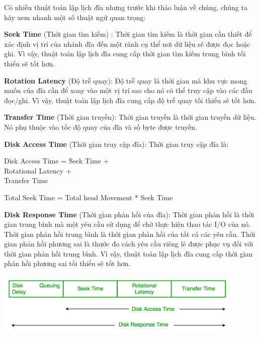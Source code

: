 \documentclass{report}
\begin{document}
    Có nhiều thuật toán lập lịch đĩa nhưng trước khi thảo luận về chúng, chúng ta hãy xem nhanh một số thuật ngữ quan trọng:

    \textbf{Seek Time} (Thời gian tìm kiếm) : Thời gian tìm kiếm là thời gian cần thiết để xác định vị trí của nhánh đĩa đến một rãnh cụ thể nơi dữ liệu sẽ được đọc hoặc ghi. Vì vậy, thuật toán lập lịch đĩa cung cấp thời gian tìm kiếm trung bình tối thiểu sẽ tốt hơn.
    
    \textbf{Rotation Latency} (Độ trễ quay): Độ trễ quay là thời gian mà khu vực mong muốn của đĩa cần để xoay vào một vị trí sao cho nó có thể truy cập vào các đầu đọc/ghi. Vì vậy, thuật toán lập lịch đĩa cung cấp độ trễ quay tối thiểu sẽ tốt hơn.
    
    \textbf{Transfer Time} (Thời gian truyền): Thời gian truyền là thời gian truyền dữ liệu. Nó phụ thuộc vào tốc độ quay của đĩa và số byte được truyền.
    
    \textbf{Disk Access Time} (Thời gian truy cập đĩa): Thời gian truy cập đĩa là:

    \begin{tcolorbox}
    
    \begin{tabbing}
    Disk Access Time =  \= Seek Time + \\
                        \> Rotational Latency + \\
                        \> Transfer Time \\
    \end{tabbing}
    
      Total Seek Time = Total head Movement * Seek Time
    \end{tcolorbox} 

    \textbf{Disk Response Time} (Thời gian phản hồi của đĩa): Thời gian phản hồi là thời gian trung bình mà một yêu cầu sử dụng để chờ thực hiện thao tác I/O của nó. Thời gian phản hồi trung bình là thời gian phản hồi của tất cả các yêu cầu. Thời gian phản hồi phương sai là thước đo cách yêu cầu riêng lẻ được phục vụ đối với thời gian phản hồi trung bình. Vì vậy, thuật toán lập lịch đĩa cung cấp thời gian phản hồi phương sai tối thiểu sẽ tốt hơn.

    \includegraphics[width = 12cm]{images/disc-scheduling-algorithms.png}
\end{document}
